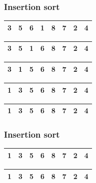 \begin{frame}
\frametitle{Insertion sort}
\begin{table}
\begin{tabular}{| c | c | c | c | c | c | c | c |}
\hline
\cellcolor{blue!25}3 & \cellcolor{blue!25}5 & \cellcolor{blue!25}6 & \cellcolor{red!25}1 & 8 & 7 & 2 & 4 \\ 
\hline
\end{tabular}
\end{table}
\begin{table}
\begin{tabular}{| c | c | c | c | c | c | c | c |}
\hline
\cellcolor{blue!25}3 & \cellcolor{blue!25}5 & \cellcolor{red!25}1 & \cellcolor{blue!25}6 & 8 & 7 & 2 & 4 \\ 
\hline
\end{tabular}
\end{table}
\begin{table}
\begin{tabular}{| c | c | c | c | c | c | c | c |}
\hline
\cellcolor{blue!25}3 & \cellcolor{red!25}1 & \cellcolor{blue!25}5 & \cellcolor{blue!25}6 & 8 & 7 & 2 & 4 \\ 
\hline
\end{tabular}
\end{table}
\begin{table}
\begin{tabular}{| c | c | c | c | c | c | c | c |}
\hline
\cellcolor{red!25}1 & \cellcolor{blue!25}3 & \cellcolor{blue!25}5 & \cellcolor{blue!25}6 & 8 & 7 & 2 & 4 \\ 
\hline
\end{tabular}
\end{table}
\begin{table}
\begin{tabular}{| c | c | c | c | c | c | c | c |}
\hline
\cellcolor{blue!25}1 & \cellcolor{blue!25}3 & \cellcolor{blue!25}5 & \cellcolor{blue!25}6 & 8 & 7 & 2 & 4 \\ 
\hline
\end{tabular}
\end{table}
\end{frame}

\begin{frame}
\frametitle{Insertion sort}
\begin{table}
\begin{tabular}{| c | c | c | c | c | c | c | c |}
\hline
\cellcolor{blue!25}1 & \cellcolor{blue!25}3 & \cellcolor{blue!25}5 & \cellcolor{blue!25}6 & \cellcolor{red!25}8 & 7 & 2 & 4 \\ 
\hline
\end{tabular}
\end{table}
\begin{table}
\begin{tabular}{| c | c | c | c | c | c | c | c |}
\hline
\cellcolor{blue!25}1 & \cellcolor{blue!25}3 & \cellcolor{blue!25}5 & \cellcolor{blue!25}6 & \cellcolor{blue!25}8 & 7 & 2 & 4 \\ 
\hline
\end{tabular}
\end{table}
\end{frame}

